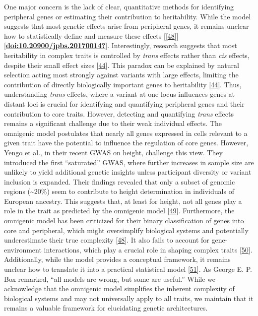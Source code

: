 One major concern is the lack of clear, quantitative methods for identifying peripheral genes or estimating their contribution to heritability.
While the model suggests that most genetic effects arise from peripheral genes, it remains unclear how to statistically define and measure these effects {[}{[}\protect\hyperlink{ref-82fs3SZo}{48}{]}{]}{[}\protect\hyperlink{ref-doi:10.20900ux2fjpbs.20170014}{\textbf{doi:10.20900/jpbs.20170014?}}{]}.
Interestingly, research suggests that most heritability in complex traits is controlled by \emph{trans} effects rather than \emph{cis} effects, despite their small effect sizes {[}\protect\hyperlink{ref-LXvTZzEA}{44}{]}.
This paradox can be explained by natural selection acting most strongly against variants with large effects, limiting the contribution of directly biologically important genes to heritability {[}\protect\hyperlink{ref-LXvTZzEA}{44}{]}.
Thus, understanding \emph{trans} effects, where a variant at one locus influences genes at distant loci is crucial for identifying and quantifying peripheral genes and their contribution to core traits.
However, detecting and quantifying \emph{trans} effects remains a significant challenge due to their weak individual effects.
The omnigenic model postulates that nearly all genes expressed in cells relevant to a given trait have the potential to influence the regulation of core genes.
However, Yengo et al., in their recent GWAS on height, challenge this view.
They introduced the first ``saturated'' GWAS, where further increases in sample size are unlikely to yield additional genetic insights unless participant diversity or variant inclusion is expanded.
Their findings revealed that only a subset of genomic regions (\textasciitilde20\%) seem to contribute to height determination in individuals of European ancestry.
This suggests that, at least for height, not all genes play a role in the trait as predicted by the omnigenic model {[}\protect\hyperlink{ref-HFRaLwGQ}{49}{]}.
Furthermore, the omnigenic model has been criticized for their binary classification of genes into core and peripheral, which might oversimplify biological systems and potentially underestimate their true complexity {[}\protect\hyperlink{ref-82fs3SZo}{48}{]}.
It also fails to account for gene-environment interactions, which play a crucial role in shaping complex traits {[}\protect\hyperlink{ref-dg9nKuy0}{50}{]}.
Additionally, while the model provides a conceptual framework, it remains unclear how to translate it into a practical statistical model {[}\protect\hyperlink{ref-1GlQtJ9Yz}{51}{]}.
As George E. P. Box remarked, ``all models are wrong, but some are useful.'' While we acknowledge that the omnigenic model simplifies the inherent complexity of biological systems and may not universally apply to all traits, we maintain that it remains a valuable framework for elucidating genetic architectures.
